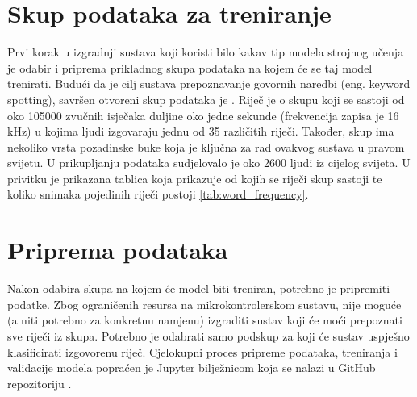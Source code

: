 \section{Skup podataka za treniranje}
\label{sec:dataset}

Prvi korak u izgradnji sustava koji koristi bilo kakav tip modela strojnog učenja
je odabir i priprema prikladnog skupa podataka na kojem će se taj model trenirati.
Budući da je cilj sustava prepoznavanje govornih naredbi (eng. keyword spotting),
savršen otvoreni skup podataka je \cite{speechcommandsv2}. Riječ je o skupu koji
se sastoji od oko 105000 zvučnih isječaka duljine oko jedne sekunde (frekvencija
zapisa je 16 kHz) u kojima ljudi
izgovaraju jednu od 35 različitih riječi. Također, skup ima nekoliko vrsta 
pozadinske buke koja je ključna za rad ovakvog sustava u pravom svijetu. 
U prikupljanju podataka sudjelovalo je oko 2600 ljudi iz cijelog svijeta.
U privitku je prikazana tablica koja prikazuje od kojih se riječi skup sastoji
te koliko snimaka pojedinih riječi postoji \ref{tab:word_frequency}.


\section{Priprema podataka}

Nakon odabira skupa na kojem će model biti treniran, potrebno je pripremiti
podatke. Zbog ograničenih resursa na mikrokontrolerskom sustavu, nije moguće
(a niti potrebno za konkretnu namjenu) izgraditi sustav koji će moći
prepoznati sve riječi iz skupa. Potrebno je odabrati samo podskup
za koji će sustav uspješno klasificirati izgovorenu riječ. Cjelokupni
proces pripreme podataka, treniranja i validacije modela popraćen je
Jupyter bilježnicom koja se nalazi u GitHub repozitoriju
\cite{balic_keyword_spotting}.


